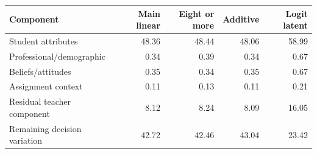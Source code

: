 \begin{tabular}{p{5cm}rrrr}
\toprule
Component & Main linear & Eight or more & Additive & Logit latent \\
\midrule
Student attributes & 48.36 & 48.44 & 48.06 & 58.99 \\
Professional/demographic & 0.34 & 0.39 & 0.34 & 0.67 \\
Beliefs/attitudes & 0.35 & 0.34 & 0.35 & 0.67 \\
Assignment context & 0.11 & 0.13 & 0.11 & 0.21 \\
Residual teacher component & 8.12 & 8.24 & 8.09 & 16.05 \\
Remaining decision variation & 42.72 & 42.46 & 43.04 & 23.42 \\
\bottomrule
\end{tabular}
